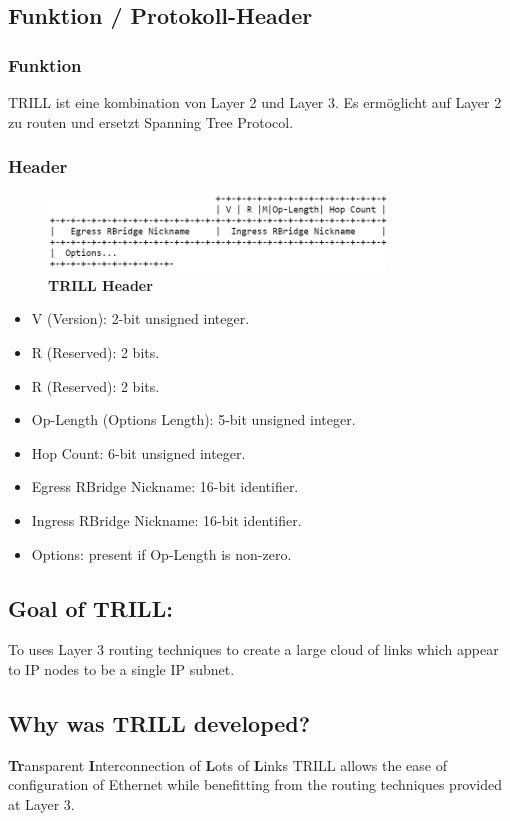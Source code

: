 \documentclass[a4,12pt]{scrartcl}
\begin{document}
\subsection{Funktion / Protokoll-Header}
\subsubsection{Funktion}
TRILL ist eine kombination von Layer 2 und Layer 3. Es ermöglicht auf Layer 2 zu routen und ersetzt Spanning Tree Protocol.
\subsubsection{Header}
\begin{figure} [H]
	\begin{center}
	\includegraphics[width=0.80\textwidth]{./pictures/trill_header.png}
	\caption{\textbf{TRILL Header}}
	\label{x}
	\end{center}
\end{figure}
\begin{itemize}
\item V (Version): 2-bit unsigned integer.
\item R (Reserved): 2 bits.
\item R (Reserved): 2 bits.
\item Op-Length (Options Length): 5-bit unsigned integer.
\item Hop Count: 6-bit unsigned integer.
\item Egress RBridge Nickname: 16-bit identifier.
\item Ingress RBridge Nickname: 16-bit identifier.
\item Options: present if Op-Length is non-zero.
\end{itemize}

\subsection{Goal of TRILL:}
To uses Layer 3 routing techniques to create a large cloud of links which appear to IP nodes to be a single IP subnet. 

\subsection{Why was TRILL developed?}
\textbf{Tr}ansparent \textbf{I}nterconnection of \textbf{L}ots of \textbf{L}inks TRILL allows the ease of configuration of Ethernet while benefitting from the routing techniques provided at Layer 3.
\end{document}
